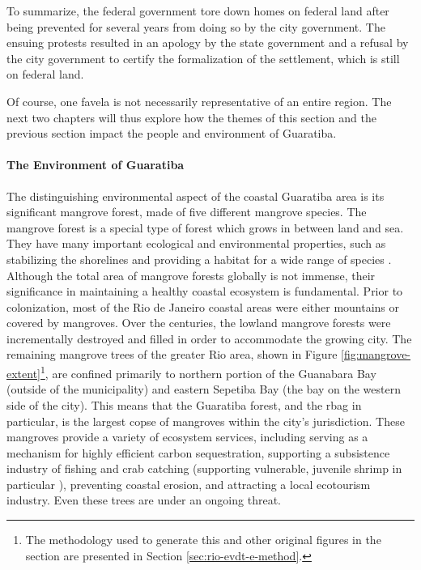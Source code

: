 To summarize, the federal government tore down homes on federal land after being prevented for several years from doing so by the city government. The ensuing protests resulted in an apology by the state government and a refusal by the city government to certify the formalization of the settlement, which is still on federal land.

Of course, one favela is not necessarily representative of an entire region. The next two chapters will thus explore how the themes of this section and the previous section impact the people and environment of Guaratiba.

\paragraph{The Environment of Guaratiba} \leavevmode\newline \label{sec:guaratiba-environment}

The distinguishing environmental aspect of the coastal Guaratiba area is its significant mangrove forest, made of five different mangrove species. The mangrove forest is a special type of forest which grows in between land and sea. They have many important ecological and environmental properties, such as stabilizing the shorelines \cite{gedanPresentFutureRole2011} and providing a habitat for a wide range of species \cite{ronnbackEcologicalBasisEconomic1999}. Although the total area of mangrove forests globally is not immense, their significance in maintaining a healthy coastal ecosystem is fundamental. Prior to colonization, most of the Rio de Janeiro coastal areas were either mountains or covered by mangroves. Over the centuries, the lowland mangrove forests were incrementally destroyed and filled in order to accommodate the growing city. The remaining mangrove trees of the greater Rio area, shown in Figure \ref{fig:mangrove-extent}\footnote{The methodology used to generate this and other original figures in the section are presented in Section \ref{sec:rio-evdt-e-method}.}, are confined primarily to northern portion of the Guanabara Bay (outside of the municipality) and eastern Sepetiba Bay (the bay on the western side of the city). This means that the Guaratiba forest, and the \ac{rbag} in particular, is the largest copse of mangroves within the city’s jurisdiction. These mangroves provide a variety of ecosystem services, including serving as a mechanism for highly efficient carbon sequestration, supporting a subsistence industry of fishing and crab catching (supporting vulnerable, juvenile shrimp in particular \cite{costaPensarMarPara1992}), preventing coastal erosion, and attracting a local ecotourism industry. Even these trees are under an ongoing threat.

